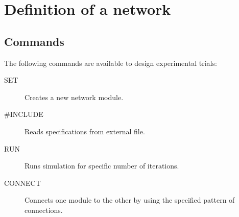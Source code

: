 \documentclass[12pt]{article}
\begin{document}
\section{Definition of a network}
\subsection{Commands}
The following commands are available to design experimental trials:
\begin{description}
  \item[SET] Creates a new network module.
  \item[\#INCLUDE] Reads specifications from external file.
  \item[RUN] Runs simulation for specific number of iterations. 
  \item[CONNECT] Connects one module to the other by using the
                 specified pattern of connections.
\end{description}

\end{document}
